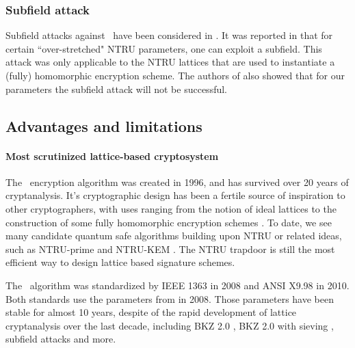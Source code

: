 \documentclass{llncs}
\newcommand{\ntru}{{\sf{NTRU}}}
\newcommand{\<}{\langle}
\renewcommand{\>}{\rangle}
\begin{document}
\subsubsection{Subfield attack}
Subfield attacks against \ntru~have been considered in \cite{subfielddjb}.
It was reported in \cite{DBLP:conf/crypto/AlbrechtBD16} that for certain ``over-stretched" NTRU parameters, one can exploit a subfield. This attack was only applicable to the NTRU lattices that are used
to instantiate a (fully) homomorphic encryption scheme. The authors of
\cite{DBLP:conf/crypto/AlbrechtBD16} also
showed that for our parameters the subfield attack will not be successful.





\subsection{Advantages and limitations}
\paragraph{Most scrutinized lattice-based cryptosystem}
The \ntru~encryption algorithm was created in 1996, and has survived over 20 years
of cryptanalysis. 
It's cryptographic design has been a fertile source of inspiration to other cryptographers, with uses ranging from the notion of ideal lattices 
\cite{DBLP:journals/cc/Micciancio07} to
the construction of some fully homomorphic encryption schemes \cite{DBLP:conf/stoc/Gentry09,ltv13}.
To date, we see many candidate quantum safe algorithms building upon NTRU or
related ideas, such as NTRU-prime \cite{DBLP:journals/iacr/BernsteinCLV16} and
NTRU-KEM \cite{DBLP:conf/ches/HulsingRSS17}. The NTRU trapdoor is still the most efficient way to design lattice based signature schemes.


The \ntru~algorithm was standardized by IEEE 1363 \cite{ieee1363_1} in 2008 and ANSI X9.98 \cite{x998} in 2010. Both standards use the parameters from \cite{params08} in 2008. Those
parameters have been stable for almost 10 years, despite of the rapid
development of lattice cryptanalysis over the last decade, including
BKZ 2.0 \cite{BKZ2}, BKZ 2.0 with sieving \cite{newhope}, subfield
attacks \cite{subfielddjb,subfieldabd,subfieldcjl,subfieldkf} and more. 
\end{document}
